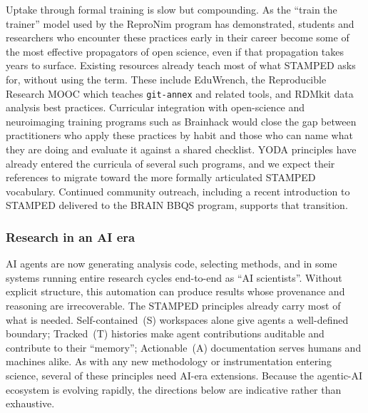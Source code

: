 \documentclass{article}
\makeatletter
\newcommand{\hyanchor}[1]{\texorpdfstring{\Hy@raisedlink{\hypertarget{#1}{}}}{}}
\newcommand{\anchoredsubsubsection}[2]{\subsubsection[#2]{\hyanchor{#1}#2}}
\makeatother
\begin{document}
Uptake through formal training is slow but compounding.
As the ``train the trainer'' model used by the ReproNim program has demonstrated, students and researchers who encounter these practices early in their career become some of the most effective propagators of open science, even if that propagation takes years to surface.
Existing resources already teach most of what STAMPED asks for, without using the term.
These include EduWrench\cite{casanova_eduwrench_2023}, the Reproducible Research MOOC which teaches \texttt{git-annex} and related tools\cite{legrand_reproducible_2022}, and RDMkit data analysis best practices\cite{elixir_rdmkit_community_data_2024}.
Curricular integration with open-science and neuroimaging training programs such as Brainhack would close the gap between practitioners who apply these practices by habit and those who can name what they are doing and evaluate it against a shared checklist.
YODA principles have already entered the curricula of several such programs, and we expect their references to migrate toward the more formally articulated STAMPED vocabulary.
Continued community outreach, including a recent introduction to STAMPED\cite{baker_guidelines_2026} delivered to the BRAIN BBQS program, supports that transition.


\anchoredsubsubsection{ai-era}{Research in an AI era}

AI agents are now generating analysis code, selecting methods, and in some systems running entire research cycles end-to-end as ``AI scientists''\cite{boiko_autonomous_2023, lu_ai_2024, mitchener_kosmos_2025}.
Without explicit structure, this automation can produce results whose provenance and reasoning are irrecoverable\cite{messeri_artificial_2024}.
The STAMPED principles already carry most of what is needed.
Self-contained~(S) workspaces alone give agents a well-defined boundary; Tracked~(T) histories make agent contributions auditable and contribute to their ``memory''; Actionable~(A) documentation serves humans and machines alike.
As with any new methodology or instrumentation entering science, several of these principles need AI-era extensions.
Because the agentic-AI ecosystem is evolving rapidly, the directions below are indicative rather than exhaustive.
\end{document}
